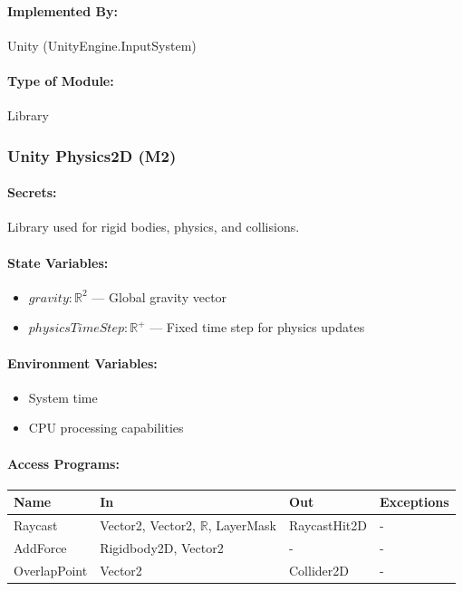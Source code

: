 \documentclass[12pt, titlepage]{article}
\begin{document}
\paragraph{Implemented By:}
Unity (UnityEngine.InputSystem)

\paragraph{Type of Module:}
Library

\vspace{10mm}

\subsubsection{Unity Physics2D (M2)} \label{M2}

\paragraph{Secrets:}
Library used for rigid bodies, physics, and collisions.

\paragraph{State Variables:}
\begin{itemize}
\item $gravity : \mathbb{R}^2$ --- Global gravity vector
\item $physicsTimeStep : \mathbb{R}^+$ --- Fixed time step for physics updates
\end{itemize}

\paragraph{Environment Variables:}
\begin{itemize}
\item System time
\item CPU processing capabilities
\end{itemize}

\paragraph{Access Programs:}

\begin{center}
\begin{tabular}{p{3cm}p{4cm}p{3cm}p{3cm}}
\toprule
\textbf{Name} & \textbf{In} & \textbf{Out} & \textbf{Exceptions} \\
\midrule
Raycast & Vector2, Vector2, $\mathbb{R}$, LayerMask & RaycastHit2D & - \\
AddForce & Rigidbody2D, Vector2 & - & - \\
OverlapPoint & Vector2 & Collider2D & - \\
\bottomrule
\end{tabular}
\end{center}
\end{document}
